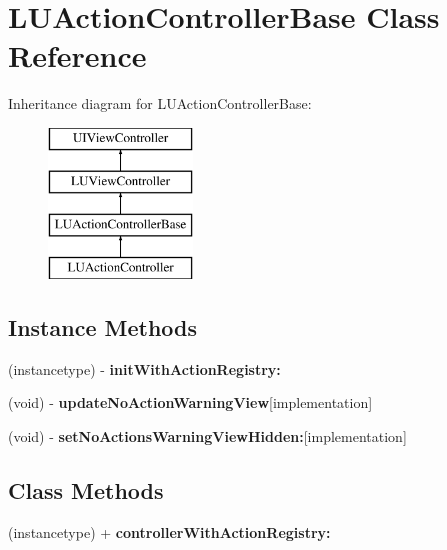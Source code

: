 \hypertarget{interface_l_u_action_controller_base}{}\section{L\+U\+Action\+Controller\+Base Class Reference}
\label{interface_l_u_action_controller_base}
Inheritance diagram for L\+U\+Action\+Controller\+Base\+:\begin{figure}[H]
\begin{center}
\leavevmode
\includegraphics[height=4.000000cm]{interface_l_u_action_controller_base}
\end{center}
\end{figure}
\subsection*{Instance Methods}
\begin{DoxyCompactItemize}
\item 
\mbox{\label{interface_l_u_action_controller_base_a7654be2aa6f87563cff4783de5236808}} 
(instancetype) -\/ {\bfseries init\+With\+Action\+Registry\+:}
\item 
\mbox{\label{interface_l_u_action_controller_base_a6e205b5b7d43dda779bd3838db34ed56}} 
(void) -\/ {\bfseries update\+No\+Action\+Warning\+View}{\ttfamily  \mbox{[}implementation\mbox{]}}
\item 
\mbox{\label{interface_l_u_action_controller_base_af416d75d478ab8fc72dbbea3d85ae44e}} 
(void) -\/ {\bfseries set\+No\+Actions\+Warning\+View\+Hidden\+:}{\ttfamily  \mbox{[}implementation\mbox{]}}
\end{DoxyCompactItemize}
\subsection*{Class Methods}
\begin{DoxyCompactItemize}
\item 
\mbox{\label{interface_l_u_action_controller_base_a24362bbe848ff5bad71a52f054e30d07}} 
(instancetype) + {\bfseries controller\+With\+Action\+Registry\+:}
\end{DoxyCompactItemize}
